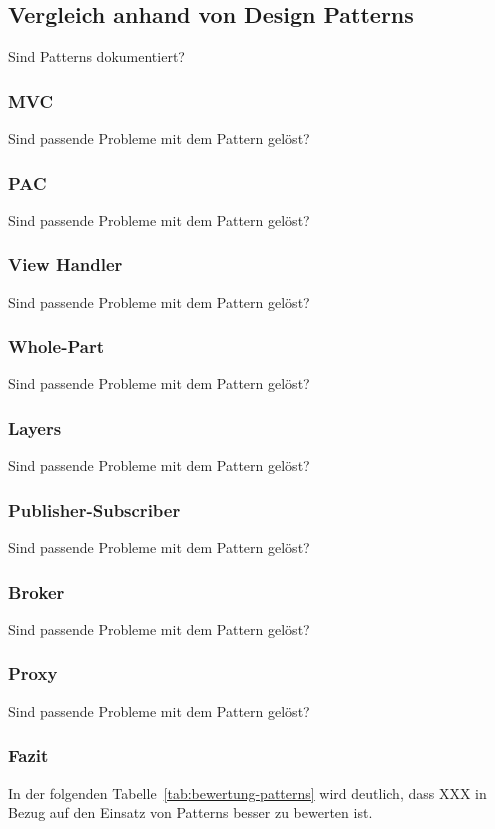 \color{red}

\subsection{Vergleich anhand von Design Patterns}
Sind Patterns dokumentiert?

\subsubsection{MVC}
Sind passende Probleme mit dem Pattern gelöst?

\subsubsection{PAC}
Sind passende Probleme mit dem Pattern gelöst?

\subsubsection{View Handler}
Sind passende Probleme mit dem Pattern gelöst?

\subsubsection{Whole-Part}
Sind passende Probleme mit dem Pattern gelöst?

\subsubsection{Layers}
Sind passende Probleme mit dem Pattern gelöst?

\subsubsection{Publisher-Subscriber}
Sind passende Probleme mit dem Pattern gelöst?

\subsubsection{Broker}
Sind passende Probleme mit dem Pattern gelöst?

\subsubsection{Proxy}
Sind passende Probleme mit dem Pattern gelöst?

\subsubsection{Fazit}
In der folgenden Tabelle~\ref{tab:bewertung-patterns} wird deutlich, dass XXX in Bezug auf den Einsatz von Patterns besser zu bewerten ist.

